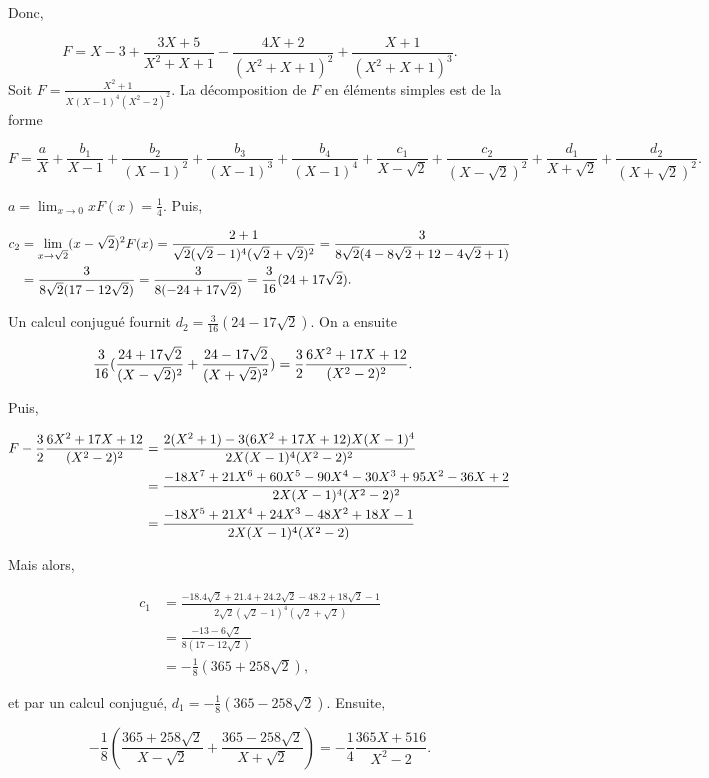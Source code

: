 {{Donc,

$$F=X-3+\frac{3X+5}{X^2+X+1}-\frac{4X+2}{(X^2+X+1)^2}+\frac{X+1}{(X^2+X+1)^3}.$$
Soit $F=\frac{X^2+1}{X(X-1)^4(X^2-2)^2}$. La décomposition de $F$ en éléments simples est de la forme

$$F=\frac{a}{X}+\frac{b_1}{X-1}+\frac{b_2}{(X-1)^2}+\frac{b_3}{(X-1)^3}+\frac{b_4}{(X-1)^4}+\frac{c_1}{X-\sqrt{2}}+\frac{c_2}{(X-\sqrt{2})^2}+\frac{d_1}{X+\sqrt{2}}+\frac{d_2}{(X+\sqrt{2})^2}.$$

$a=\lim_{x\rightarrow 0}xF(x)=\frac{1}{4}$. Puis, 

\begin{align*}\ensuremath
c_2&=\lim_{x \rightarrow \sqrt{2}}(x-\sqrt{2})^2F(x)=\frac{2+1}{\sqrt{2}(\sqrt{2}-1)^4(\sqrt{2}+\sqrt{2})^2}
=\frac{3}{8\sqrt{2}(4-8\sqrt{2}+12-4\sqrt{2}+1)}\\
 &=\frac{3}{8\sqrt{2}(17-12\sqrt{2})}=\frac{3}{8(-24+17\sqrt{2})}=\frac{3}{16}(24+17\sqrt{2}).
\end{align*}

Un calcul conjugué fournit $d_2=\frac{3}{16}(24-17\sqrt{2})$. On a ensuite

\begin{align*}\ensuremath
\frac{3}{16}(\frac{24+17\sqrt{2}}{(X-\sqrt{2})^2}+\frac{24-17\sqrt{2}}{(X+\sqrt{2})^2})&=\frac{3}{2}\frac{6X^2+17X+12}{(X^2-2)^2}.
\end{align*}

Puis,

\begin{align*}\ensuremath
F-\frac{3}{2}\frac{6X^2+17X+12}{(X^2-2)^2}&=\frac{2(X^2+1)-3(6X^2+17X+12)X(X-1)^4}{2X(X-1)^4(X^2-2)^2}\\
 &=\frac{-18X^7+21X^6+60X^5-90X^4-30X^3+95X^2-36X+2}{2X(X-1)^4(X^2-2)^2}\\
 &=\frac{-18X^5+21X^4+24X^3-48X^2+18X-1}{2X(X-1)^4(X^2-2)}
\end{align*}

Mais alors,

\begin{align*}
c_1 &= \frac{-18.4\sqrt{2}+21.4+24.2\sqrt{2}-48.2+18\sqrt{2}-1}{2\sqrt{2}(\sqrt{2}-1)^4(\sqrt{2}+\sqrt{2})} \\
&= \frac{-13-6\sqrt{2}}{8(17-12\sqrt{2})} \\
&= -\frac{1}{8}(365+258\sqrt{2}),
\end{align*}

et par un calcul conjugué, $d_1=-\frac{1}{8}(365-258\sqrt{2})$. Ensuite,

$$-\frac{1}{8}(\frac{365+258\sqrt{2}}{X-\sqrt{2}}+\frac{365-258\sqrt{2}}{X+\sqrt{2}})=
-\frac{1}{4}\frac{365X+516}{X^2-2}.$$

}}

